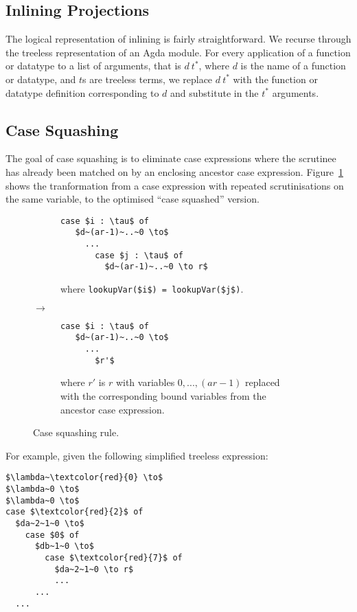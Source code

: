 \subsection{Inlining Projections}

The logical representation of inlining is fairly straightforward. We recurse through the treeless representation of an Agda module. For every application of a function or datatype to a list of arguments, that is $d~t^*$, where $d$ is the name of a function or datatype, and $t$s are treeless terms, we replace $d~t^*$ with the function or datatype definition corresponding to $d$ and substitute in the $t^*$ arguments.

\subsection{Case Squashing}

The goal of case squashing is to eliminate case expressions where the scrutinee has already been matched on by an enclosing ancestor case expression. Figure~\ref{fig:case_squash_rule} shows the tranformation from a case expression with repeated scrutinisations on the same variable, to the optimised ``case squashed'' version.

\begin{figure}[h]
\centering
\begin{subfigure}{.47\textwidth}
  \centering
  \begin{lstlisting}[style=math]
  case $i : \tau$ of
   $d~(ar-1)~..~0 \to$
     ...
       case $j : \tau$ of
         $d~(ar-1)~..~0 \to r$
  \end{lstlisting}
  where \lstinline[style=math]{lookupVar($i$) = lookupVar($j$)}.
\end{subfigure}
{\large$\to$}
\begin{subfigure}{.47\textwidth}
  \centering
  \begin{lstlisting}[style=math]
  case $i : \tau$ of
   $d~(ar-1)~..~0 \to$
     ...
       $r'$
  \end{lstlisting}
  where $r'$ is $r$ with variables $0, ..., (ar-1)$ replaced with the corresponding bound variables from the ancestor case expression.
\end{subfigure}
\caption{Case squashing rule.}
\label{fig:case_squash_rule}
\end{figure}

For example, given the following simplified treeless expression:

\begin{lstlisting}[style=math]
$\lambda~\textcolor{red}{0} \to$
$\lambda~0 \to$
$\lambda~0 \to$
case $\textcolor{red}{2}$ of
  $da~2~1~0 \to$
    case $0$ of
      $db~1~0 \to$
        case $\textcolor{red}{7}$ of
          $da~2~1~0 \to r$
          ...
      ...
  ...
\end{lstlisting}

